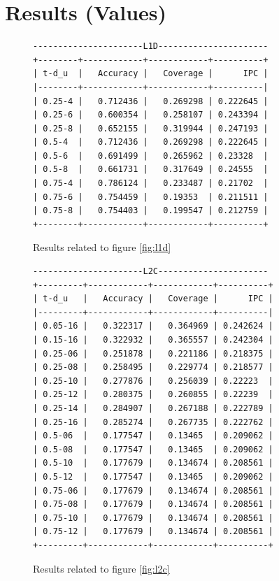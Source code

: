 \documentclass[11pt, swedish, openany]{book}
\begin{document}
\section{Results (Values)}
\label{sec:result_values}

\begin{figure}[H]
    \centering
    \begin{BVerbatim}
----------------------L1D----------------------
+--------+------------+------------+----------+
| t-d_u  |   Accuracy |   Coverage |      IPC |
|--------+------------+------------+----------|
| 0.25-4 |   0.712436 |   0.269298 | 0.222645 |
| 0.25-6 |   0.600354 |   0.258107 | 0.243394 |
| 0.25-8 |   0.652155 |   0.319944 | 0.247193 |
| 0.5-4  |   0.712436 |   0.269298 | 0.222645 |
| 0.5-6  |   0.691499 |   0.265962 | 0.23328  |
| 0.5-8  |   0.661731 |   0.317649 | 0.24555  |
| 0.75-4 |   0.786124 |   0.233487 | 0.21702  |
| 0.75-6 |   0.754459 |   0.19353  | 0.211511 |
| 0.75-8 |   0.754403 |   0.199547 | 0.212759 |
+--------+------------+------------+----------+
    \end{BVerbatim}
    \caption{Results related to figure \ref{fig:l1d}}
\end{figure}

\begin{figure}[H]
    \centering
    \begin{BVerbatim}
----------------------L2C----------------------
+---------+------------+------------+----------+
| t-d_u   |   Accuracy |   Coverage |      IPC |
|---------+------------+------------+----------|
| 0.05-16 |   0.322317 |   0.364969 | 0.242624 |
| 0.15-16 |   0.322932 |   0.365557 | 0.242304 |
| 0.25-06 |   0.251878 |   0.221186 | 0.218375 |
| 0.25-08 |   0.258495 |   0.229774 | 0.218577 |
| 0.25-10 |   0.277876 |   0.256039 | 0.22223  |
| 0.25-12 |   0.280375 |   0.260855 | 0.22239  |
| 0.25-14 |   0.284907 |   0.267188 | 0.222789 |
| 0.25-16 |   0.285274 |   0.267735 | 0.222762 |
| 0.5-06  |   0.177547 |   0.13465  | 0.209062 |
| 0.5-08  |   0.177547 |   0.13465  | 0.209062 |
| 0.5-10  |   0.177679 |   0.134674 | 0.208561 |
| 0.5-12  |   0.177547 |   0.13465  | 0.209062 |
| 0.75-06 |   0.177679 |   0.134674 | 0.208561 |
| 0.75-08 |   0.177679 |   0.134674 | 0.208561 |
| 0.75-10 |   0.177679 |   0.134674 | 0.208561 |
| 0.75-12 |   0.177679 |   0.134674 | 0.208561 |
+---------+------------+------------+----------+
    \end{BVerbatim}
    \caption{Results related to figure \ref{fig:l2c}}
\end{figure}
\end{document}
